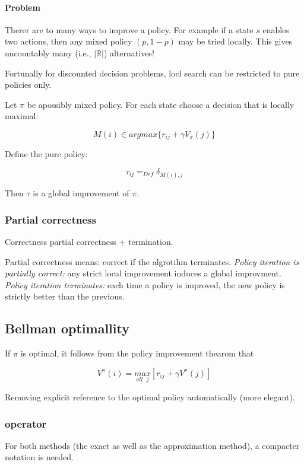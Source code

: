 \documentclass{article}
\begin{document}
\paragraph{Problem} Therer are to many ways to improve a policy.
For example if a state $s$ enables two actions, then any
mixed policy $(p, 1-p)$ may be tried locally. This gives
uncountably many (i.e., $|\mathbb{R}|$) alternatives!

Fortunally for discounted decision problems, locl search can be
restricted to pure policies only.

Let $\pi$ be apossibly mixed policy. For each state choose a decision
that is locally maximal:

\[M(i) \in argmax\{r_{ij} + \gamma V_\pi(j)\} \]

Define the pure policy:

\[ \tau_{ij} =_{Def} \delta_{M(i),j} \]

Then $\tau$ is a global improvement of $\pi$.

\subsubsection{Partial correctness}

Correctness  partial correctness + termination.

Partial correctness means: correct if the algrotihm terminates.
\emph{Policy iteration is partially correct:} any strict
local improvement induces a global improvment.
\emph{Policy iteration terminates:} each time a policy is improved,
the new policy is strictly better than the previous.

\subsection{Bellman optimallity}

If $\pi$ is optimal, it follows from the policy improvement thearom that

\[ V^\pi(i) = \underset{all\mbox{\ }j}{max}[r_{ij} + \gamma V^\pi(j)] \]

Removing explicit reference to the optimal policy automatically (more elegant).

\subsubsection{operator}

For both methods (the exact as well as the approximation method),
a compacter notation is needed.
\end{document}
